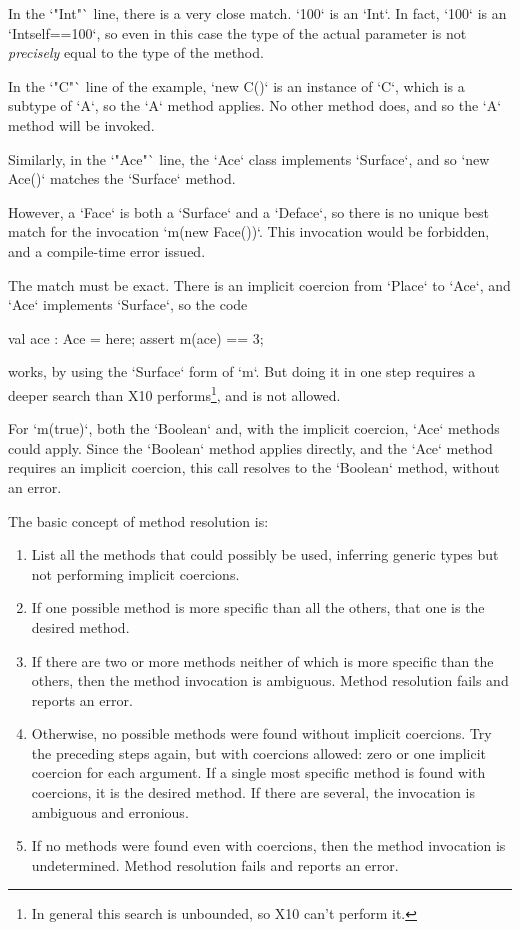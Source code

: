\begin{ex}
In the \xcd`"Int"` line, there is a very close match.  \xcd`100` is an
\xcd`Int`.  In fact, \xcd`100` is an \xcd`Int{self==100}`, so even in this
case the type of the actual parameter is not {\em precisely} equal to the type
of the method.

In the \xcd`"C"` line of the example, \xcd`new C()` is an instance of \xcd`C`,
which is a subtype of \xcd`A`, so the \xcd`A` method applies.  No other method
does, and so the \xcd`A` method will be invoked.

Similarly, in the \xcd`"Ace"` line, the \xcd`Ace` class implements
\xcd`Surface`, and so \xcd`new Ace()` matches the \xcd`Surface` method. 

However, a \xcd`Face` is both a \xcd`Surface` and a \xcd`Deface`, so there is
no unique best match for the invocation \xcd`m(new Face())`.  This invocation
would be forbidden, and a compile-time error issued.


The match must be exact.  There is an implicit coercion 
from \xcd`Place` to \xcd`Ace`, and \xcd`Ace` implements \xcd`Surface`, so the
code
\begin{xten}
val ace : Ace = here;
assert m(ace) == 3;
\end{xten}
works, by using the \xcd`Surface` form of \xcd`m`.  But doing it in one step
requires a deeper search than X10 performs\footnote{In general this search is
unbounded, so X10 can't perform it.}, and is not allowed.


For \xcd`m(true)`, both the \xcd`Boolean` and, with the implicit coercion,
\xcd`Ace` methods could apply.  Since the \xcd`Boolean` method applies
directly, and the \xcd`Ace` method requires an implicit coercion, this call
resolves to the \xcd`Boolean` method, without an error.

\end{ex}


The basic concept of method resolution is:
\begin{enumerate}
\item List all the methods that could possibly be used, inferring generic
      types but not performing implicit coercions.    
\item If one possible method is more specific than all the others, that one 
      is the desired method.
\item If there are two or more methods neither of which is more specific than
      the others, then the method invocation is ambiguous.  Method resolution
      fails and reports an error.
\item Otherwise, no possible methods were found without implicit coercions.
      Try the preceding steps again, but with coercions allowed: zero or one
      implicit coercion for each argument.  If a single
      most specific method is found with coercions, it is the desired method.
      If there are several, the invocation is ambiguous and erronious.
\item If no methods were found even with coercions, then the method invocation
      is undetermined.  Method resolution fails and reports an error.
\end{enumerate}

